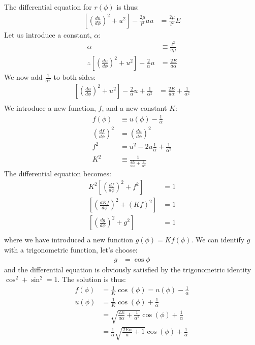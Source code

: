 The differential equation for $r(\phi)$ is thus:
\begin{align}
\left[\left( \frac{du}{d\phi} \right)^2+u^2\right]-\frac{2\mu}{l^2}au&=\frac{2\mu}{l^2}E
\end{align}
Let us introduce a constant, $\alpha$:
\begin{align}
\alpha&\equiv\frac{l^2}{a\mu}\nonumber\\
\therefore \left[\left( \frac{du}{d\phi} \right)^2+u^2\right]-\frac{2}{\alpha}u&=\frac{2E}{a\alpha}
\end{align}
We now add $\frac{1}{\alpha^2}$ to both sides:
\begin{align}
\left[\left( \frac{du}{d\phi} \right)^2+u^2\right]-\frac{2}{\alpha}u+\frac{1}{\alpha^2}&=\frac{2E}{a\alpha}+\frac{1}{\alpha^2}\nonumber\\
\end{align}
We introduce a new function, $f$, and a new constant $K$:
\begin{align}
f(\phi)&\equiv u(\phi)-\frac{1}{\alpha}\nonumber\\
\left(\frac{df}{d\phi}\right)^2&=\left(\frac{du}{d\phi}\right)^2\nonumber\\
f^2&=u^2-2u\frac{1}{\alpha}+\frac{1}{\alpha^2}\nonumber\\
K^2&\equiv\frac{1}{\frac{2E}{a\alpha}+\frac{1}{\alpha^2}}
\end{align}
The differential equation becomes:
\begin{align}
K^2\left[\left( \frac{df}{d\phi} \right)^2+f^2\right]&=1\nonumber\\
\left[\left( \frac{dKf}{d\phi} \right)^2+(Kf)^2\right]&=1\nonumber\\
\left[\left( \frac{dg}{d\phi} \right)^2+g^2\right]&=1\nonumber\\
\end{align}
where we have introduced a new function $g(\phi)=Kf(\phi)$. We can identify $g$ with a trigonometric function, let's choose:
\begin{align}
g&=\cos\phi
\end{align}
and the differential equation is obviously satisfied by the trigonometric identity $\cos^2+\sin^2=1$. The solution is thus:
\begin{align}
f(\phi)&=\frac{1}{K}\cos(\phi)= u(\phi)-\frac{1}{\alpha}\nonumber\\
u(\phi)&=\frac{1}{K}\cos(\phi)+\frac{1}{\alpha}\nonumber\\
&=\sqrt{\frac{2E}{a\alpha}+\frac{1}{\alpha^2}}\cos(\phi)+\frac{1}{\alpha}\nonumber\\
&=\frac{1}{\alpha}\sqrt{\frac{2E\alpha}{a}+1}\cos(\phi)+\frac{1}{\alpha}\nonumber\\
\end{align}
